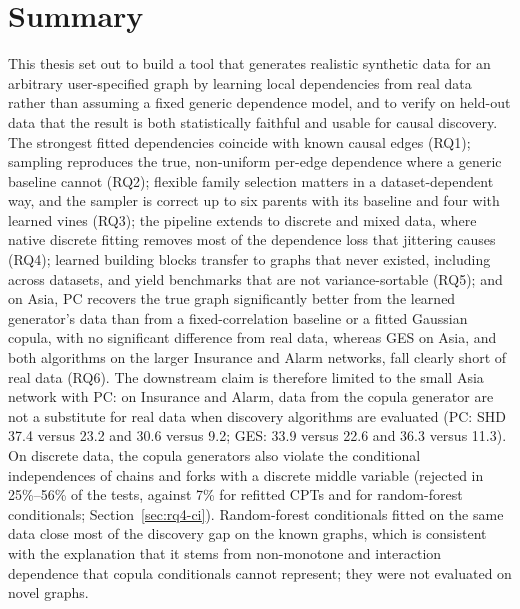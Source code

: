 \documentclass[
  english,
  class=report,
  accentcolor=2c,
  marginpar=false,
  parskip=half-,
  fontsize=11pt,
  ruledheaders=false,
  pdfa=false,
  IMRAD=false,
  thesis={type=master}
]{tudapub}
\begin{document}
\section{Summary}
This thesis set out to build a tool that generates realistic synthetic data
for an arbitrary user-specified graph by learning local dependencies from
real data rather than assuming a fixed generic dependence model, and to
verify on held-out data that the result is both statistically faithful and
usable for causal discovery. The strongest fitted dependencies coincide
with known causal edges (RQ1); sampling reproduces the true, non-uniform
per-edge dependence where a generic baseline cannot (RQ2); flexible family
selection matters in a dataset-dependent way, and the sampler is correct up
to six parents with its baseline and four with learned vines (RQ3); the
pipeline extends to discrete and mixed data, where native discrete fitting
removes most of the dependence loss that jittering causes (RQ4); learned
building blocks transfer to graphs that never existed, including across
datasets, and yield benchmarks that are not variance-sortable (RQ5); and on
Asia, PC recovers the true graph significantly better from the learned
generator's data than from a fixed-correlation baseline or a fitted
Gaussian copula, with no significant difference from real data, whereas GES on Asia, and both
algorithms on the larger Insurance and Alarm networks, fall clearly short of
real data (RQ6). The downstream claim is therefore limited to the small
Asia network with PC: on Insurance and Alarm, data from the copula generator
are not a substitute for real data when discovery algorithms are evaluated
(PC: SHD 37.4 versus 23.2 and 30.6 versus 9.2; GES: 33.9 versus 22.6 and
36.3 versus 11.3). On discrete data, the copula generators also violate the conditional independences of chains and forks with a discrete middle variable (rejected in 25\%--56\% of the tests, against 7\% for refitted CPTs and for random-forest conditionals; Section~\ref{sec:rq4-ci}).
Random-forest conditionals fitted on the same data close most of the
discovery gap on the known graphs, which is consistent with the explanation
that it stems from non-monotone and interaction dependence that copula
conditionals cannot represent; they were not evaluated on novel graphs.
\end{document}
